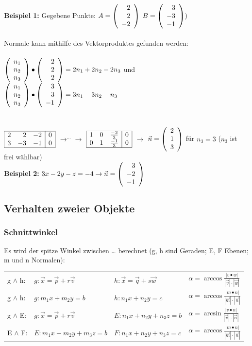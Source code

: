		\textbf{Beispiel 1:} Gegebene Punkte: $A=\left(\begin{array}{r} 2 \\ 2 \\ -2 \\ \end{array}\right)$
									 $B=\left(\begin{array}{r} 3 \\ -3 \\ -1 \\ \end{array}\right))$ \\ \ \\
							 Normale kann mithilfe des Vektorproduktes gefunden werden: \\ \ \\
									 $\left(\begin{array}{r} n_1 \\ n_2 \\ n_3 \\ \end{array}\right)\bullet\left(\begin{array}{r} 2 \\ 2 \\ -2 \\ \end{array}\right)=2n_1+2n_2-2n_3$ und
									 $\left(\begin{array}{r} n_1 \\ n_2 \\ n_3 \\ \end{array}\right)\bullet\left(\begin{array}{r} 3 \\ -3 \\ -1 \\ \end{array}\right)=3n_1-3n_2-n_3$\\ \ \\ \ \\
							$\begin{array}{|rrr|r|}
								\hline 
									2 & 2 & -2 & 0 \\
									3 & -3 & -1 & 0 \\
								\hline
							\end{array}$
							$\rightarrow^{...}\rightarrow$	
							$\begin{array}{|rrr|r|}
								\hline 
									1 & 0 & \frac{-2}{3} & 0 \\
									0 & 1 & \frac{-1}{3} & 0 \\
								\hline
							\end{array}$
							$\rightarrow$
							$\vec{n}=\left(\begin{array}{r} 2 \\ 1 \\ 3 \\ \end{array}\right)$ für $n_3 = 3$ ($n_3$ ist frei wählbar)\\
	 \textbf{Beispiel 2:} $3x-2y-z=-4\rightarrow\vec{n}=\left(\begin{array}{r} 3 \\ -2 \\ -1 \\ \end{array}\right)$
		
\subsection{Verhalten zweier Objekte}
	\subsubsection{Schnittwinkel}
		Es wird der spitze Winkel zwischen \ldots{ }berechnet (g, h sind Geraden; E, F Ebenen; m und n Normalen):\\
		\begin{tabular}{llll}
		g $\wedge$ h:
		&$g: \vec{x}=\vec{p}+r\vec{v}$ 
		&$h: \vec{x}=\vec{q}+s\vec{w}$ 
		&$\alpha=\arccos{\frac{|v\bullet w|}{|\vec{v}|\cdot|\vec{w}|}}$\\
		g $\wedge$ h:
		&$g: m_1x+m_2y=b$
		&$h: n_1x+n_2y=c$
		&$\alpha=\arccos{\frac{|m\bullet n|}{|\vec{m}|\cdot|\vec{n}|}}$\\
		g $\wedge$ E:
		&$g: \vec{x}=\vec{p}+r\vec{v}$
		&$E: n_1x+n_2y+n_3z=b$
		&$\alpha=\arcsin{\frac{|v\bullet n|}{|\vec{v}|\cdot|\vec{n}|}}$\\
		E $\wedge$ F:
		&$E: m_1x+m_2y+m_3z=b$
		&$F: n_1x+n_2y+n_3z=c$
		&$\alpha=\arccos{\frac{|m\bullet n|}{|\vec{m}|\cdot|\vec{n}|}}$\\
		\end{tabular}

